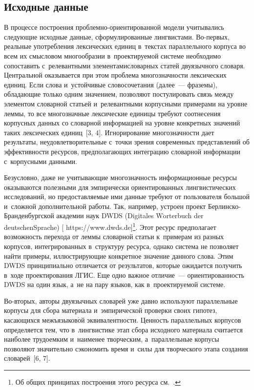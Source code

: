 \begin{multicols}{2}
\section{Исходные данные}

  В процессе построения проб\-лем\-но-ори\-ен\-ти\-ро\-ван\-ной модели учитывались 
сле\-ду\-ющие исходные данные, сформулированные лингвистами. Во-пер\-вых, 
реальные упо\-треб\-ле\-ния лексических единиц в~текс\-тах параллельного корпуса 
во всем их смыс\-ло\-вом многообразии в~проектируемой сис\-те\-ме необходимо 
со\-по\-ста\-вить с~релевантными элементами\linebreak словарных статей двуязычного 
словаря. Цент\-раль\-ной оказывается при этом проб\-ле\-ма мно\-го\-знач\-ности 
лексических единиц. Если слова и~устойчивые словосочетания (далее~--- 
фраземы), \mbox{об\-ла\-да\-ющие} только одним значением, поз\-во\-ля\-ют постулировать 
связь между элементом словарной статьей и~релевантными корпусными 
примерами на уровне лем\-мы, то все многозначные лексические единицы 
требуют соотнесения корпусных данных со словарной информацией на уровне 
конкретных значений таких лексических единиц~[3, 4]. Игнорирование 
многозначности дает результаты, неудовлетворительные с~точ\-ки зрения 
современных пред\-став\-ле\-ний об эф\-фек\-тив\-ности ресурсов, пред\-по\-ла\-га\-ющих 
интеграцию словарной информации с~корпусными данными.
  
  Безусловно, даже не учитывающие мно\-го\-знач\-ность информационные 
ресурсы оказываются полезными для эмпирически ориентированных 
лингвистических исследований, но предостав\-ля\-емые ими данные требуют от 
пользователя большой и~слож\-ной дополнительной работы. Так, например, 
устроен проект Бер\-лин\-ско-Бран\-ден\-бург\-ской академии наук DWDS (Digitales 
W$\ddot{\mbox{o}}$rterbuch der deutschen\linebreak Sprache) [{\sf 
https://www.dwds.de}]\footnote{Об общих принципах построения этого ресурса  
см.~\cite{5-zac}.}. Этот ресурс предполагает воз\-мож\-ность перехода от леммы 
словарной \mbox{статьи} к~примерам из разных корпусов, интегрированных 
в~структуру ресурса, однако \mbox{сис\-те\-ма} не позволяет найти примеры, 
ил\-люст\-ри\-ру\-ющие конкретное значение данного слова. Этим DWDS 
принципиально отличается от результатов, которые ожидается получить в~ходе 
проектирования ЛГИС. Еще одно 
важное отличие~--- ориентированность DWDS на один язык, а~не на пару 
языков, как в~про\-ек\-ти\-ру\-емой сис\-теме.
  
  Во-вторых, авторы двуязычных словарей уже дав\-но используют 
параллельные корпусы для сбора материала и~эмпирической проверки своих 
гипотез, ка\-са\-ющих\-ся межъязыков$\acute{\mbox{о}}$й эквивалентности. 
Ценность параллельных корпусов определяется тем, что в~лингвистике этап 
сбора исходного материала считается наиболее трудоемким и~наименее 
творческим, а~параллельные корпусы позволяют значительно сэкономить время и~силы для творческого этапа создания словарей~[6, 7].
  

\end{multicols}

